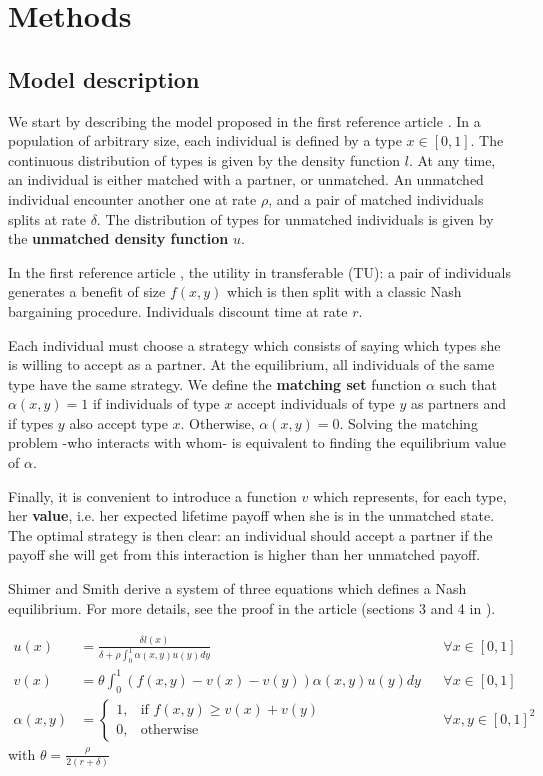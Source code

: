 \section*{Methods}

\subsection*{Model description}

We start by describing the model proposed in the first reference article \citep{shimer_assortative_2000}. In a population of arbitrary size, each individual is defined by a type $x \in [0,1]$. The continuous distribution of types is given by the density function $l$. At any time, an individual is either matched with a partner, or unmatched. An unmatched individual encounter another one at rate $\rho$, and a pair of matched individuals splits at rate $\delta$. The distribution of types for unmatched individuals is given by the \textbf{unmatched density function} $u$.

In the first reference article \citep{shimer_assortative_2000}, the utility in transferable (TU): a pair of individuals generates a benefit of size $f(x,y)$ which is then split with a classic Nash bargaining procedure. Individuals discount time at rate $r$.

Each individual must choose a strategy which consists of saying which types she is willing to accept as a partner. At the equilibrium, all individuals of the same type have the same strategy. We define the \textbf{matching set} function $\alpha$ such that $\alpha(x,y) = 1$ if individuals of type $x$ accept individuals of type $y$ as partners and if types $y$ also accept type $x$. Otherwise, $\alpha(x,y) = 0$. Solving the matching problem -who interacts with whom- is equivalent to finding the equilibrium value of $\alpha$.

Finally, it is convenient to introduce a function $v$ which represents, for each type, her \textbf{value}, i.e. her expected lifetime payoff when she is in the unmatched state. The optimal strategy is then clear: an individual should accept a partner if the payoff she will get from this interaction is higher than her unmatched payoff.

Shimer and Smith derive a system of three equations which defines a Nash equilibrium. For more details, see the proof in the article (sections 3 and 4 in \citep{shimer_assortative_2000}).

\begin{align*}[left=\empheqlbrace]
	u(x) &= \frac{\delta l(x)}{\delta + \rho \int_{0}^{1} \alpha(x,y) u(y) dy} &&\forall x \in [0,1]\\
	v(x) &= \theta \int_{0}^{1} (f(x,y)-v(x)-v(y)) \alpha(x,y) u(y) dy &&\forall x \in [0,1]\\
	\alpha(x,y) &=
	\begin{cases}
    	1, & \text{if } f(x,y) \geq v(x)+v(y)\\
    	0, & \text{otherwise}
	\end{cases}
	&&\forall x,y \in [0,1]^2 
\end{align*}
with $\theta = \frac{\rho}{2(r+\delta)}$ 


